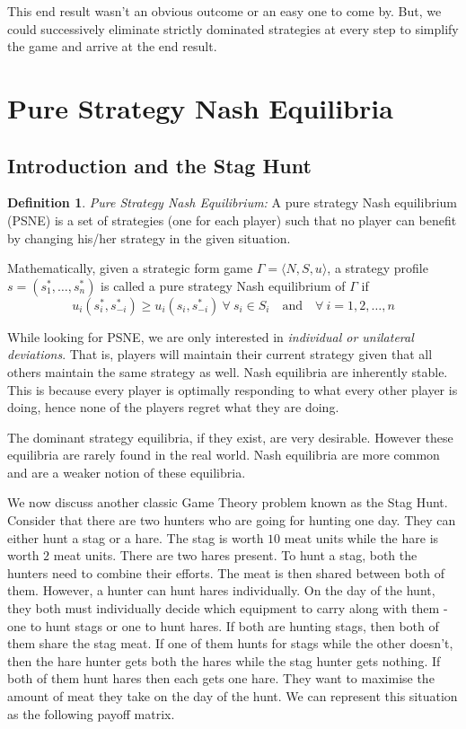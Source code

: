 \documentclass{article}
\theoremstyle{definition}
\newtheorem{defn}[theorem]{Definition}
\begin{document}
This end result wasn't an obvious outcome or an easy one to come by. But, we could successively eliminate strictly dominated strategies at every step to simplify the game and arrive at the end result. \medskip

\section{Pure Strategy Nash Equilibria}

\subsection{Introduction and the Stag Hunt}

\begin{defn}
\textit{Pure Strategy Nash Equilibrium:} A pure strategy Nash equilibrium (PSNE) is a set of strategies (one for each player) such that no player can benefit by changing his/her strategy in the given situation. \medskip

Mathematically, given a strategic form game $\Gamma = \langle N, S, u \rangle$, a strategy profile $s = (s^{*}_1, \ldots , s^{*}_n)$ is called a pure strategy Nash equilibrium of $\Gamma$ if
\[
    u_i(s^{*}_i, s^{*}_{-i}) \geq u_i(s_i, s^{*}_{-i}) \: \forall \: s_i \in S_i \quad \text{and} \quad \forall \: i = 1,2,\ldots , n
\]
\end{defn}

While looking for PSNE, we are only interested in \textit{individual or unilateral deviations}. That is, players will maintain their current strategy given that all others maintain the same strategy as well. Nash equilibria are inherently stable. This is because every player is optimally responding to what every other player is doing, hence none of the players regret what they are doing. \medskip

The dominant strategy equilibria, if they exist, are very desirable. However these equilibria are rarely found in the real world. Nash equilibria are more common and are a weaker notion of these equilibria. \medskip

We now discuss another classic Game Theory problem known as the Stag Hunt. Consider that there are two hunters who are going for hunting one day. They can either hunt a stag or a hare. The stag is worth $10$ meat units while the hare is worth $2$ meat units. There are two hares present. To hunt a stag, both the hunters need to combine their efforts. The meat is then shared between both of them. However, a hunter can hunt hares individually. On the day of the hunt, they both must individually decide which equipment to carry along with them - one to hunt stags or one to hunt hares. If both are hunting stags, then both of them share the stag meat. If one of them hunts for stags while the other doesn't, then the hare hunter gets both the hares while the stag hunter gets nothing. If both of them hunt hares then each gets one hare. They want to maximise the amount of meat they take on the day of the hunt. We can represent this situation as the following payoff matrix. \medskip
\end{document}
